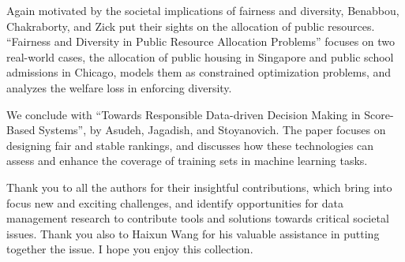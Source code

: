 \documentclass[11pt]{article}
\begin{document}
Again motivated by the societal implications of fairness and
diversity, Benabbou, Chakraborty, and Zick put their sights on the
allocation of public resources. ``Fairness and Diversity in Public
Resource Allocation Problems'' focuses on two real-world cases, the
allocation of public housing in Singapore and public school
admissions in Chicago, models them as constrained optimization
problems, and analyzes the welfare loss in enforcing diversity.

We conclude with ``Towards Responsible Data-driven Decision Making
in Score-Based Systems'', by Asudeh, Jagadish, and Stoyanovich. The
paper focuses on designing fair and stable rankings, and discusses
how these technologies can assess and enhance the coverage of
training sets in machine learning tasks.

Thank you to all the authors for their insightful contributions,
which bring into focus new and exciting challenges, and identify
opportunities for data management research to contribute tools and
solutions towards critical societal issues. Thank you also to
Haixun Wang for his valuable assistance in putting together the
issue. I hope you enjoy this collection.
\end{document}
